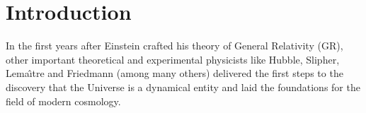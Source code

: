 \chapter*{Introduction \label{IntroIntro}} %





\done{}
In the first years after Einstein crafted his theory of General Relativity (GR), other important theoretical and experimental physicists like Hubble, Slipher, Lema\^{\i}tre and Friedmann 
(among many others) delivered the first steps to the discovery 
that the Universe is a dynamical entity and laid the foundations for the field of modern cosmology.

